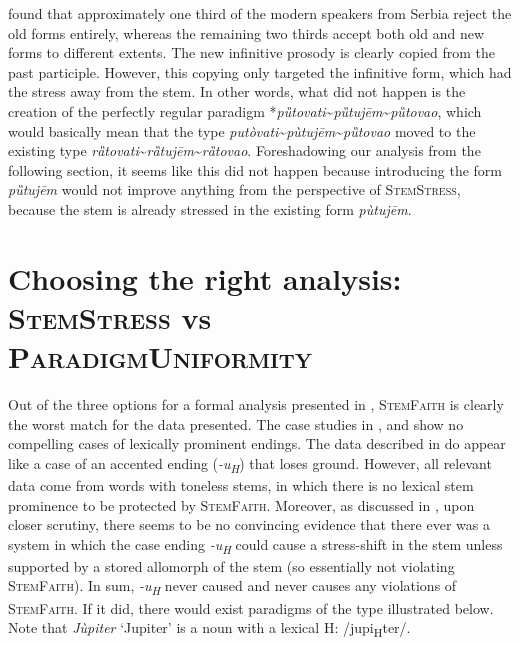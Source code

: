 \documentclass[output=paper,modfonts,nonflat
]{langsci/langscibook}
\begin{document}
\citet[]{Simonovic2015} found that approximately one third of the modern speakers from Serbia reject the old forms entirely, whereas the remaining two thirds accept both old and new forms to different extents.
The new infinitive prosody is clearly copied from the past participle. However, this copying only targeted the infinitive form, which had the stress away from the stem. In other words, what did not happen is the creation of the perfectly regular paradigm *\textit{pȕtovati}\textasciitilde{}\textit{pȕtujēm}\textasciitilde{}\textit{pȕtovao}, which would basically mean that the type \textit{putòvati}\textasciitilde{}\textit{pùtujēm}\textasciitilde{}\textit{pȕtovao} moved to the existing type \textit{rȁtovati}\textasciitilde{}\textit{rȁtujēm}\textasciitilde{}\textit{rȁtovao}. Foreshadowing our analysis from the following section, it seems like this did not happen because introducing the form \textit{pȕtujēm} would not improve anything from the perspective of \textsc{StemStress}, because the stem is already stressed in the existing form \textit{pùtujēm}.

\section{Choosing the right analysis: \textsc{StemStress} vs \textsc{ParadigmUniformity}} \label{sec:kager:3}
Out of the three options for a formal analysis presented in , \textsc{StemFaith} is clearly the worst match for the data presented. The case studies in ,   and  show no compelling cases of lexically prominent endings. The data described in   do appear like a case of an accented ending (\textit{{-u}\textsubscript{H}}) that loses ground. However, all relevant data come from words with toneless stems, in which there is no lexical stem prominence to be protected by \textsc{StemFaith}. Moreover, as discussed in , upon closer scrutiny, there seems to be no convincing evidence that there ever was a system in which the case ending \textit{-u\textsubscript{H}} could cause a stress-shift in the stem unless supported by a stored allomorph of the stem (so essentially not violating \textsc{StemFaith}). In sum, \textit{-u\textsubscript{H}} never caused and never causes any violations of \textsc{StemFaith}. If it did, there would exist paradigms of the type illustrated below. Note that \textit{Jùpiter} `Jupiter' is a noun with a lexical H: /jupi\textsubscript{H}ter/. 
\end{document}
